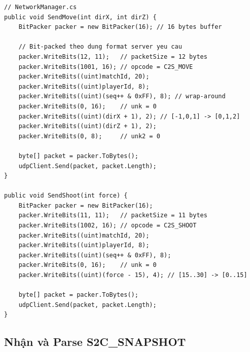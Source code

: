 \documentclass[12pt,a4paper]{report}
\begin{document}
\begin{lstlisting}[style=bashStyle, caption={Encode và gửi gói C2S\_MOVE}, label={lst:sendmove}]
// NetworkManager.cs
public void SendMove(int dirX, int dirZ) {
    BitPacker packer = new BitPacker(16); // 16 bytes buffer

    // Bit-packed theo dung format server yeu cau
    packer.WriteBits(12, 11);   // packetSize = 12 bytes
    packer.WriteBits(1001, 16); // opcode = C2S_MOVE
    packer.WriteBits((uint)matchId, 20);
    packer.WriteBits((uint)playerId, 8);
    packer.WriteBits((uint)(seq++ & 0xFF), 8); // wrap-around
    packer.WriteBits(0, 16);    // unk = 0
    packer.WriteBits((uint)(dirX + 1), 2); // [-1,0,1] -> [0,1,2]
    packer.WriteBits((uint)(dirZ + 1), 2);
    packer.WriteBits(0, 8);     // unk2 = 0

    byte[] packet = packer.ToBytes();
    udpClient.Send(packet, packet.Length);
}

public void SendShoot(int force) {
    BitPacker packer = new BitPacker(16);
    packer.WriteBits(11, 11);   // packetSize = 11 bytes
    packer.WriteBits(1002, 16); // opcode = C2S_SHOOT
    packer.WriteBits((uint)matchId, 20);
    packer.WriteBits((uint)playerId, 8);
    packer.WriteBits((uint)(seq++ & 0xFF), 8);
    packer.WriteBits(0, 16);    // unk = 0
    packer.WriteBits((uint)(force - 15), 4); // [15..30] -> [0..15]

    byte[] packet = packer.ToBytes();
    udpClient.Send(packet, packet.Length);
}
\end{lstlisting}

\subsection{Nhận và Parse S2C\_SNAPSHOT}
\end{document}
